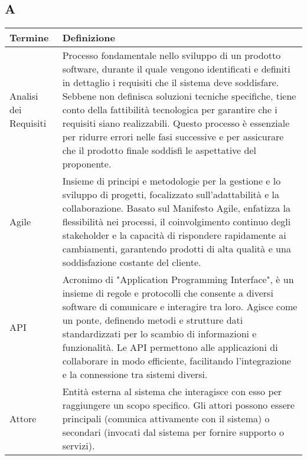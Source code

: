 \documentclass[10pt]{article}
\begin{document}
\subsection{A} %
\begin{longtable}{|>{\centering\arraybackslash}m{2.5cm}|>{\arraybackslash}m{12.5cm}|}
\hline
\rowcolor[gray]{0.8}
\textbf{Termine} & \textbf{Definizione}\\
\endhead
\hline
Analisi dei Requisiti & Processo fondamentale nello sviluppo di un prodotto software, durante il quale vengono identificati e definiti in dettaglio i requisiti che il sistema deve soddisfare. Sebbene non definisca soluzioni tecniche specifiche, tiene conto della fattibilità tecnologica per garantire che i requisiti siano realizzabili. Questo processo è essenziale per ridurre errori nelle fasi successive e per assicurare che il prodotto finale soddisfi le aspettative del proponente.\\
\hline
Agile & Insieme di principi e metodologie per la gestione e lo sviluppo di progetti, focalizzato sull'adattabilità e la collaborazione. Basato sul Manifesto Agile, enfatizza la flessibilità nei processi, il coinvolgimento continuo degli stakeholder e la capacità di rispondere rapidamente ai cambiamenti, garantendo prodotti di alta qualità e una soddisfazione costante del cliente.\\
\hline
API & Acronimo di "Application Programming Interface", è un insieme di regole e protocolli che consente a diversi software di comunicare e interagire tra loro. Agisce come un ponte, definendo metodi e strutture dati standardizzati per lo scambio di informazioni e funzionalità. Le API permettono alle applicazioni di collaborare in modo efficiente, facilitando l'integrazione e la connessione tra sistemi diversi.\\
\hline
Attore & Entità esterna al sistema che interagisce con esso per raggiungere un scopo specifico. Gli attori possono essere principali (comunica attivamente con il sistema) o secondari (invocati dal sistema per fornire supporto o servizi).\\
\hline
\end{longtable}
\end{document}
